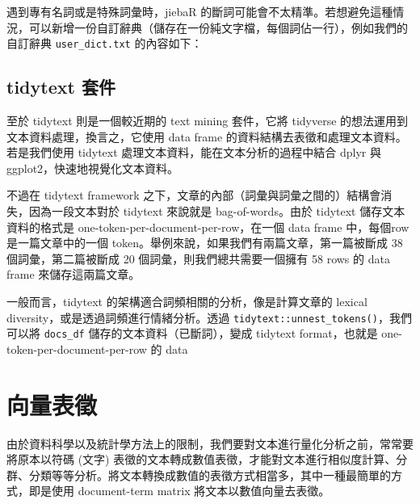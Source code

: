 遇到專有名詞或是特殊詞彙時，jiebaR
的斷詞可能會不太精準。若想避免這種情況，可以新增一份自訂辭典（儲存在一份純文字檔，每個詞佔一行），例如我們的自訂辭典
\texttt{user\_dict.txt} 的內容如下：

\hypertarget{tidytext-ux5957ux4ef6}{%
\subsection{tidytext 套件}\label{tidytext-ux5957ux4ef6}}

至於 tidytext 則是一個較近期的 text mining 套件，它將 tidyverse
的想法運用到文本資料處理，換言之，它使用 data frame
的資料結構去表徵和處理文本資料。若是我們使用 tidytext
處理文本資料，能在文本分析的過程中結合 dplyr 與
ggplot2，快速地視覺化文本資料。

不過在 tidytext framework
之下，文章的內部（詞彙與詞彙之間的）結構會消失，因為一段文本對於
tidytext 來說就是 bag-of-words。由於 tidytext 儲存文本資料的格式是
one-token-per-document-per-row，在一個 data frame 中，每個row
是一篇文章中的一個 token。舉例來說，如果我們有兩篇文章，第一篇被斷成 38
個詞彙，第二篇被斷成 20 個詞彙，則我們總共需要一個擁有 58 rows 的 data
frame 來儲存這兩篇文章。

一般而言，tidytext 的架構適合詞頻相關的分析，像是計算文章的 lexical
diversity，或是透過詞頻進行情緒分析。透過
\texttt{tidytext::unnest\_tokens()}，我們可以將 \texttt{docs\_df}
儲存的文本資料（已斷詞），變成 tidytext format，也就是
one-token-per-document-per-row 的 data

\hypertarget{ux5411ux91cfux8868ux5fb5}{%
\section{向量表徵}\label{ux5411ux91cfux8868ux5fb5}}

由於資料科學以及統計學方法上的限制，我們要對文本進行量化分析之前，常常要將原本以符碼
(文字)
表徵的文本轉成數值表徵，才能對文本進行相似度計算、分群、分類等等分析。將文本轉換成數值的表徵方式相當多，其中一種最簡單的方式，即是使用
document-term matrix 將文本以數值向量去表徵。


